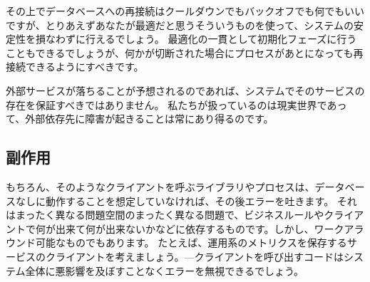 その上でデータベースへの再接続はクールダウンでもバックオフでも何でもいいですが、とりあえずあなたが最適だと思うそういうものを使って、システムの安定性を損なわずに行えるでしょう。
最適化の一貫として初期化フェーズに行うこともできるでしょうが、何かが切断された場合にプロセスがあとになっても再接続できるようにすべきです。

外部サービスが落ちることが予想されるのであれば、システムでそのサービスの存在を保証すべきではありません。
私たちが扱っているのは現実世界であって、外部依存先に障害が起きることは常にあり得るのです。

\subsection{副作用}
\label{subsec:start-link-side-effects}

もちろん、そのようなクライアントを呼ぶライブラリやプロセスは、データベースなしに動作することを想定していなければ、その後エラーを吐きます。
それはまったく異なる問題空間のまったく異なる問題で、ビジネスルールやクライアントで何が出来て何が出来ないかなどに依存するものです。しかし、ワークアラウンド可能なものでもあります。
たとえば、運用系のメトリクスを保存するサービスのクライアントを考えましょう。---クライアントを呼び出すコードはシステム全体に悪影響を及ぼすことなくエラーを無視できるでしょう。

